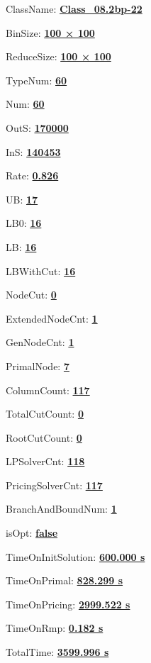 \documentclass[11pt]{article}
\begin{document}
\pagestyle{empty}


ClassName: \underline{\textbf{Class_08.2bp-22}}
\par
BinSize: \underline{\textbf{100 × 100}}
\par
ReduceSize: \underline{\textbf{100 × 100}}
\par
TypeNum: \underline{\textbf{60}}
\par
Num: \underline{\textbf{60}}
\par
OutS: \underline{\textbf{170000}}
\par
InS: \underline{\textbf{140453}}
\par
Rate: \underline{\textbf{0.826}}
\par
UB: \underline{\textbf{17}}
\par
LB0: \underline{\textbf{16}}
\par
LB: \underline{\textbf{16}}
\par
LBWithCut: \underline{\textbf{16}}
\par
NodeCut: \underline{\textbf{0}}
\par
ExtendedNodeCnt: \underline{\textbf{1}}
\par
GenNodeCnt: \underline{\textbf{1}}
\par
PrimalNode: \underline{\textbf{7}}
\par
ColumnCount: \underline{\textbf{117}}
\par
TotalCutCount: \underline{\textbf{0}}
\par
RootCutCount: \underline{\textbf{0}}
\par
LPSolverCnt: \underline{\textbf{118}}
\par
PricingSolverCnt: \underline{\textbf{117}}
\par
BranchAndBoundNum: \underline{\textbf{1}}
\par
isOpt: \underline{\textbf{false}}
\par
TimeOnInitSolution: \underline{\textbf{600.000 s}}
\par
TimeOnPrimal: \underline{\textbf{828.299 s}}
\par
TimeOnPricing: \underline{\textbf{2999.522 s}}
\par
TimeOnRmp: \underline{\textbf{0.182 s}}
\par
TotalTime: \underline{\textbf{3599.996 s}}
\par
\newpage


\end{document}
